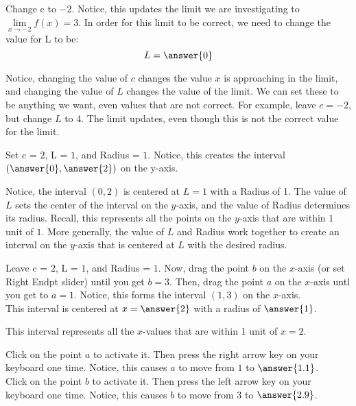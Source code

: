 \documentclass{ximera}
\begin{document}
\begin{exercise}
    \begin{question}
   	  Change c to $-2$.  Notice, this updates the limit we are investigating to $\lim\limits_{x \to -2}f(x)=3$.  In order for this limit to be correct, we need to change the value for L to be: 
   	  \[
   	      L=\answer{0}
   	  \]
   	  \begin{feedback}
   	  	Notice, changing the value of $ c $ changes the value $x$ is approaching in the limit, and changing the value of $L$ changes the value of the limit.  We can set these to be anything we want, even values that are not correct.  For example, leave $ c=-2 $, but change $ L $ to 4.  The limit updates, even though this is not the correct value for the limit.
   	  \end{feedback}
      \begin{question}
      	Set c = $2$, L = $1$, and Radius = $1$.  Notice, this creates the interval $\left(\answer{0}, \answer{2}\right)$ on the y-axis.
      	\begin{feedback}
      		Notice, the interval $(0,2)$ is centered at $L=1$ with a Radius of 1.  The value of $ L $ sets the center of the interval on the $y$-axis, and the value of Radius determines its radius.  Recall, this represents all the points on the $y$-axis that are within $1$ unit of $1$.  More generally, the value of $ L $ and Radius work together to create an interval on the $y$-axis that is centered at $ L $ with the desired radius.
      	\end{feedback}
        \begin{question}
        	Leave c = $2$, L = $1$, and Radius = $1$.  Now, drag the point $b$ on the $x$-axis (or set Right Endpt slider) until you get $b=3$.  Then, drag the point $a$ on the $x$-axis untl you get to $a=1$.  Notice, this forms the interval $(1,3)$ on the $x$-axis. \\
        	This interval is centered at $x=\answer{2}$ with a radius of $\answer{1}$.
        	\begin{feedback}
        		This interval represents all the $x$-values that are within 1 unit of $x=2$.
        	\end{feedback}
        	\begin{question}
        		Click on the point $a$ to activate it.  Then press the right arrow key on your keyboard one time.  Notice, this causes $a$ to move from $1$ to $\answer{1.1}$.\\
        		Click on the point $b$ to activate it.  Then press the left arrow key on your keyboard one time.  Notice, this causes $b$ to move from $3$ to $\answer{2.9}$.\\

\end{question}
\end{question}
\end{question}
\end{question}
\end{exercise}
\end{document}
